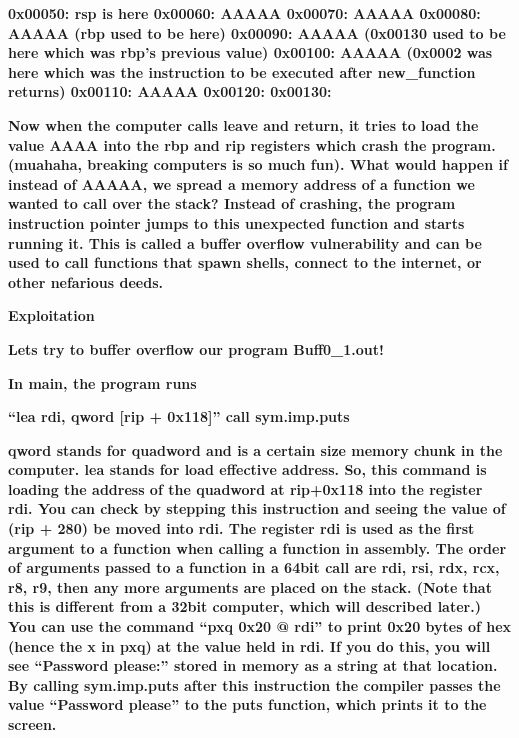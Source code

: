 \documentclass[letterpaper]{article}
\begin{document}
\textbf{0x00050: rsp is here\newline
0x00060: AAAAA\newline
0x00070: AAAAA\newline
0x00080: AAAAA (rbp used to be here)\newline
0x00090: AAAAA (0x00130 used to be here which was rbp's previous value)\newline
0x00100: AAAAA (0x0002 was here which was the instruction to be executed after new\_function returns)\newline
0x00110: AAAAA\newline
0x00120:\newline
0x00130:}

\textbf{Now when the computer calls leave and return, it tries to load the value AAAA into the rbp and rip registers
which crash the program. (muahaha, breaking computers is so much fun). What would happen if instead of AAAAA, we spread
a memory address of a function we wanted to call over the stack? Instead of crashing, the program instruction pointer
jumps to this unexpected function and starts running it. This is called a buffer overflow vulnerability and can be used
to call functions that spawn shells, connect to the internet, or other nefarious deeds.}

{\centering
\textbf{Exploitation}
\par}

\textbf{Lets try to buffer overflow our program Buff0\_1.out!}

\textbf{In main, the program runs}

\textbf{{}``lea rdi, qword [rip + 0x118]''\newline
call sym.imp.puts}

\textbf{qword stands for quadword and is a certain size memory chunk in the computer. lea stands for load effective
address. So, this command is loading the address of the quadword at rip+0x118 into the register rdi. You can check by
stepping this instruction and seeing the value of (rip + 280) be moved into rdi. The register rdi is used as the first
argument to a function when calling a function in assembly. The order of arguments passed to a function in a 64bit call
are rdi, rsi, rdx, rcx, r8, r9, then any more arguments are placed on the stack. (Note that this is different from a
32bit computer, which will described later.) You can use the command ``pxq 0x20 @ rdi'' to print 0x20 bytes of hex
(hence the x in pxq) at the value held in rdi. If you do this, you will see ``Password please:'' stored in memory as a
string at that location. By calling sym.imp.puts after this instruction the compiler passes the value ``Password
please'' to the puts function, which prints it to the screen.}
\end{document}
